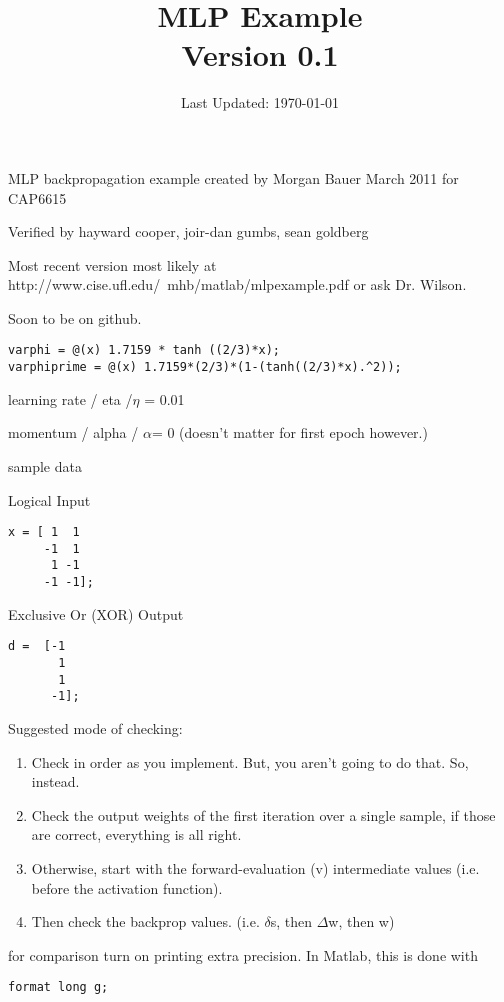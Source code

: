 \documentclass{article}
\title{MLP Example \\ \normalsize Version 0.1}
\date{Last Updated: \today}
\begin{document}
\maketitle



MLP backpropagation example created by Morgan Bauer March 2011 for CAP6615

Verified by hayward cooper, joir-dan gumbs, sean goldberg

Most recent version most likely at http://www.cise.ufl.edu/~mhb/matlab/mlpexample.pdf
or ask Dr. Wilson.

Soon to be on github.



\begin{verbatim}
varphi = @(x) 1.7159 * tanh ((2/3)*x);
varphiprime = @(x) 1.7159*(2/3)*(1-(tanh((2/3)*x).^2));
\end{verbatim}

learning rate / eta /\(\eta\)  = 0.01

momentum / alpha / \(\alpha\)= 0 (doesn't matter for first epoch however.)

sample data

Logical Input
\begin{verbatim}
x = [ 1  1
     -1  1
      1 -1
     -1 -1];
\end{verbatim}
Exclusive Or (XOR) Output
\begin{verbatim}
d =  [-1
       1
       1
      -1];
\end{verbatim}

  Suggested mode of checking: 
\begin{enumerate}
\item Check in order as you implement. But, you aren't going to do that. So, instead.
\item 
 Check the output weights of the first
  iteration over a single sample, if those are correct, everything is
  all right. 

\item Otherwise, start with the forward-evaluation (v)
  intermediate values (i.e. before the activation function).  

\item Then
  check the backprop values. (i.e. $\delta$s, then $\Delta$w, then w)
\end{enumerate}

for comparison turn on printing extra precision.
In Matlab, this is done with 
\begin{verbatim}
format long g;
\end{verbatim}
\end{document}
